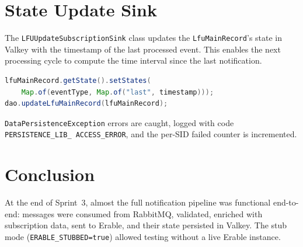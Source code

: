 \section{State Update Sink}

The \texttt{LFUUpdateSubscriptionSink} class updates the \texttt{LfuMainRecord}'s state in Valkey with the timestamp of the last processed event. This enables the next processing cycle to compute the time interval since the last notification.

\begin{lstlisting}[language=Java, caption={State update in Valkey}]
lfuMainRecord.getState().setStates(
    Map.of(eventType, Map.of("last", timestamp)));
dao.updateLfuMainRecord(lfuMainRecord);
\end{lstlisting}

\texttt{DataPersistenceException} errors are caught, logged with code \texttt{PERSISTENCE\_LIB\_ ACCESS\_ERROR}, and the per-SID failed counter is incremented.

\section*{Conclusion}

At the end of Sprint~3, almost the full notification pipeline was functional end-to-end: messages were consumed from RabbitMQ, validated, enriched with subscription data, sent to Erable, and their state persisted in Valkey. The stub mode (\texttt{ERABLE\_STUBBED=true}) allowed testing without a live Erable instance.

